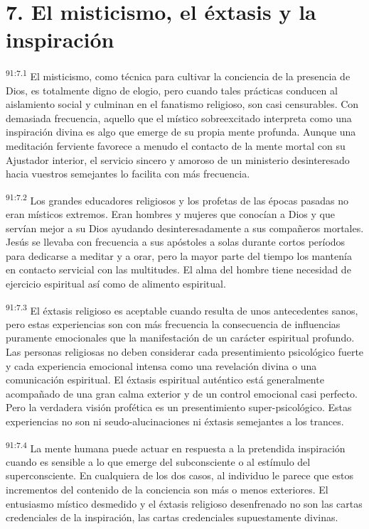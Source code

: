 \documentclass[twoside, 11pt]{book}
\begin{document}
\section*{7. El misticismo, el éxtasis y la inspiración}
\par
\textsuperscript{91:7.1} El misticismo, como técnica para cultivar la conciencia de la presencia de Dios, es totalmente digno de elogio, pero cuando tales prácticas conducen al aislamiento social y culminan en el fanatismo religioso, son casi censurables. Con demasiada frecuencia, aquello que el místico sobreexcitado interpreta como una inspiración divina es algo que emerge de su propia mente profunda. Aunque una meditación ferviente favorece a menudo el contacto de la mente mortal con su Ajustador interior, el servicio sincero y amoroso de un ministerio desinteresado hacia vuestros semejantes lo facilita con más frecuencia.

\par
\textsuperscript{91:7.2} Los grandes educadores religiosos y los profetas de las épocas pasadas no eran místicos extremos. Eran hombres y mujeres que conocían a Dios y que servían mejor a su Dios ayudando desinteresadamente a sus compañeros mortales. Jesús se llevaba con frecuencia a sus apóstoles a solas durante cortos períodos para dedicarse a meditar y a orar, pero la mayor parte del tiempo los mantenía en contacto servicial con las multitudes. El alma del hombre tiene necesidad de ejercicio espiritual así como de alimento espiritual.

\par
\textsuperscript{91:7.3} El éxtasis religioso es aceptable cuando resulta de unos antecedentes sanos, pero estas experiencias son con más frecuencia la consecuencia de influencias puramente emocionales que la manifestación de un carácter espiritual profundo. Las personas religiosas no deben considerar cada presentimiento psicológico fuerte y cada experiencia emocional intensa como una revelación divina o una comunicación espiritual. El éxtasis espiritual auténtico está generalmente acompañado de una gran calma exterior y de un control emocional casi perfecto. Pero la verdadera visión profética es un presentimiento super-psicológico. Estas experiencias no son ni seudo-alucinaciones ni éxtasis semejantes a los trances.

\par
\textsuperscript{91:7.4} La mente humana puede actuar en respuesta a la pretendida inspiración cuando es sensible a lo que emerge del subconsciente o al estímulo del superconsciente. En cualquiera de los dos casos, al individuo le parece que estos incrementos del contenido de la conciencia son más o menos exteriores. El entusiasmo místico desmedido y el éxtasis religioso desenfrenado no son las cartas credenciales de la inspiración, las cartas credenciales supuestamente divinas.
\end{document}
